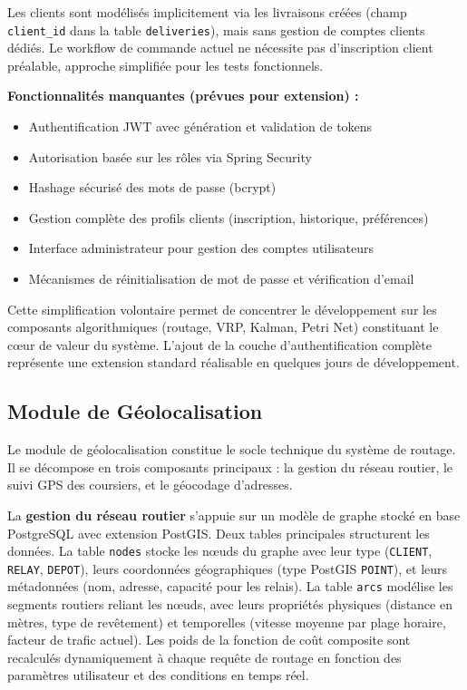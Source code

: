Les clients sont modélisés implicitement via les livraisons créées (champ \texttt{client\_id} dans la table \texttt{deliveries}), mais sans gestion de comptes clients dédiés. Le workflow de commande actuel ne nécessite pas d'inscription client préalable, approche simplifiée pour les tests fonctionnels.

\textbf{Fonctionnalités manquantes (prévues pour extension) :}

\begin{itemize}
    \item Authentification JWT avec génération et validation de tokens
    \item Autorisation basée sur les rôles via Spring Security
    \item Hashage sécurisé des mots de passe (bcrypt)
    \item Gestion complète des profils clients (inscription, historique, préférences)
    \item Interface administrateur pour gestion des comptes utilisateurs
    \item Mécanismes de réinitialisation de mot de passe et vérification d'email
\end{itemize}

Cette simplification volontaire permet de concentrer le développement sur les composants algorithmiques (routage, VRP, Kalman, Petri Net) constituant le cœur de valeur du système. L'ajout de la couche d'authentification complète représente une extension standard réalisable en quelques jours de développement.

\subsection{Module de Géolocalisation}

Le module de géolocalisation constitue le socle technique du système de routage. Il se décompose en trois composants principaux : la gestion du réseau routier, le suivi GPS des coursiers, et le géocodage d'adresses.

La \textbf{gestion du réseau routier} s'appuie sur un modèle de graphe stocké en base PostgreSQL avec extension PostGIS. Deux tables principales structurent les données. La table \texttt{nodes} stocke les nœuds du graphe avec leur type (\texttt{CLIENT}, \texttt{RELAY}, \texttt{DEPOT}), leurs coordonnées géographiques (type PostGIS \texttt{POINT}), et leurs métadonnées (nom, adresse, capacité pour les relais). La table \texttt{arcs} modélise les segments routiers reliant les nœuds, avec leurs propriétés physiques (distance en mètres, type de revêtement) et temporelles (vitesse moyenne par plage horaire, facteur de trafic actuel). Les poids de la fonction de coût composite sont recalculés dynamiquement à chaque requête de routage en fonction des paramètres utilisateur et des conditions en temps réel.

